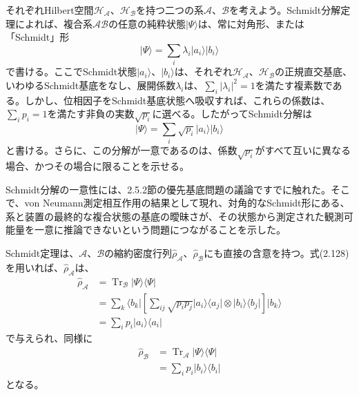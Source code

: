 \hypertarget{srcpage:104}{}\label{srcpage:104}
それぞれHilbert空間$\mathcal H_{\mathcal A}$、$\mathcal H_{\mathcal B}$を持つ二つの系$\mathcal A$、$\mathcal B$を考えよう。Schmidt分解定理\cite{ref144}によれば、複合系$\mathcal{AB}$の任意の純粋状態$\lvert\Psi\rangle$は、常に対角形、または「Schmidt」形
\begin{equation}\lvert\Psi\rangle=\sum_i\lambda_i\lvert a_i\rangle\lvert b_i\rangle\tag{2.127}\end{equation}
で書ける。ここでSchmidt状態$\lvert a_i\rangle$、$\lvert b_i\rangle$は、それぞれ$\mathcal H_{\mathcal A}$、$\mathcal H_{\mathcal B}$の正規直交基底、いわゆるSchmidt基底をなし、展開係数$\lambda_i$は、$\sum_i\lvert\lambda_i\rvert^2=1$を満たす複素数である。しかし、位相因子をSchmidt基底状態へ吸収すれば、これらの係数は、$\sum_i p_i=1$を満たす非負の実数$\sqrt{p_i}$に選べる。したがってSchmidt分解は
\begin{equation}\lvert\Psi\rangle=\sum_i\sqrt{p_i}\lvert a_i\rangle\lvert b_i\rangle\tag{2.128}\end{equation}
と書ける。さらに、この分解が一意であるのは、係数$\sqrt{p_i}$がすべて互いに異なる場合、かつその場合に限ることを示せる。

Schmidt分解の一意性には、2.5.2節の優先基底問題の議論ですでに触れた。そこで、von Neumann測定相互作用の結果として現れ、対角的なSchmidt形にある、系と装置の最終的な複合状態の基底の曖昧さが、その状態から測定された観測可能量を一意に推論できないという問題につながることを示した。

Schmidt定理は、$\mathcal A$、$\mathcal B$の縮約密度行列$\hat\rho_{\mathcal A}$、$\hat\rho_{\mathcal B}$にも直接の含意を持つ。式(2.128)を用いれば、$\hat\rho_{\mathcal A}$は、
\begin{equation}\begin{split}\hat\rho_{\mathcal A}&=\operatorname{Tr}_{\mathcal B}\lvert\Psi\rangle\langle\Psi\rvert\\&=\sum_k\langle b_k\rvert\left[\sum_{ij}\sqrt{p_ip_j}\lvert a_i\rangle\langle a_j\rvert\otimes\lvert b_i\rangle\langle b_j\rvert\right]\lvert b_k\rangle\\&=\sum_i p_i\lvert a_i\rangle\langle a_i\rvert\end{split}\tag{2.129}\end{equation}
で与えられ、同様に
\begin{equation}\begin{split}\hat\rho_{\mathcal B}&=\operatorname{Tr}_{\mathcal A}\lvert\Psi\rangle\langle\Psi\rvert\\&=\sum_i p_i\lvert b_i\rangle\langle b_i\rvert\end{split}\tag{2.130}\end{equation}
となる。

